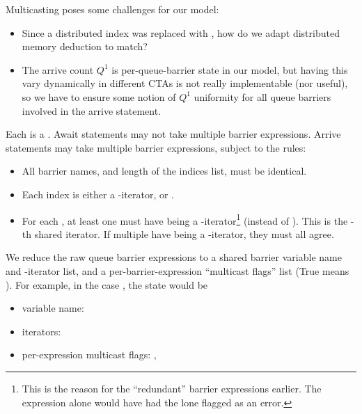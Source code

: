 Multicasting poses some challenges for our model:
\begin{itemize}
\item Since a distributed index was replaced with \lighttt{:}, how do we adapt distributed memory deduction to match?
\filbreak
\item The arrive count $Q^1$ is per-queue-barrier state in our model, but having this vary dynamically in different CTAs is not really implementable (nor useful), so we have to ensure some notion of $Q^1$ uniformity for all queue barriers involved in the arrive statement.
\end{itemize}

\filbreak
{}

Each  is a .
Await statements may not take multiple barrier expressions.
Arrive statements may take multiple barrier expressions, subject to the rules:
\begin{itemize}
  \item All barrier names, and length of the indices list, must be identical.
  \filbreak
  \item Each index is either a -iterator, or \lighttt{:}.
  \filbreak
  \item For each , at least one  must have  being a -iterator\footnote{This is the reason for the ``redundant'' barrier expressions earlier. The expression  alone would have had the lone \lighttt{:} flagged as an error.} (instead of \lighttt{:}).
    This is the -th shared  iterator.
    If multiple  have  being a -iterator, they must all agree.
\end{itemize}

\filbreak
We reduce the raw queue barrier expressions to a shared barrier variable name and -iterator list, and a per-barrier-expression ``multicast flags'' list (True means \lighttt{:}).
For example, in the case , the state would be
\begin{itemize}
  \item variable name: 
  \filbreak
  \item iterators: 
  \filbreak
  \item per-expression multicast flags: , 
\end{itemize}

